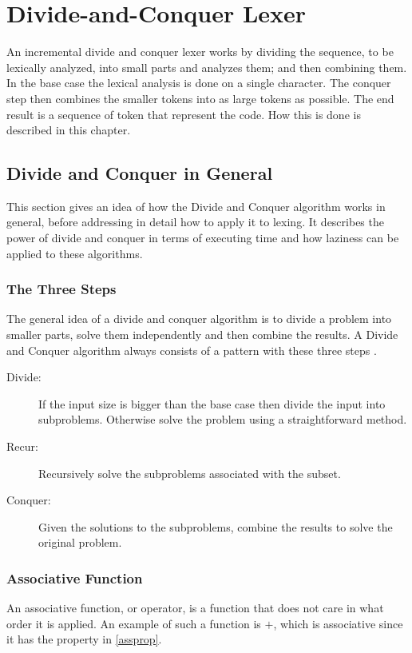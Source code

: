 \chapter{Divide-and-Conquer Lexer}
An incremental divide and conquer lexer works by dividing the sequence, to be
lexically analyzed, into small parts and analyzes them; and then combining them.
In the base case the lexical analysis is done on a single character. The
conquer step then combines the smaller tokens into as large tokens as possible.
The end result is a sequence of token that represent the code. How this is done
is described in this chapter.

\section{Divide and Conquer in General}
This section gives an idea of how the Divide and Conquer algorithm
works in general, before addressing in detail how to apply it to lexing. It
describes the power of divide and conquer in terms of executing time and how
laziness can be applied to these algorithms.

\subsection{The Three Steps}
The general idea of a divide and conquer algorithm is to divide a problem into
smaller parts, solve them independently and then combine the results. A Divide
and Conquer algorithm always consists of a pattern with these three steps
\cite{Goodrich}.
\begin{description}
\item[Divide:] If the input size is bigger than the base case then divide the
input into subproblems. Otherwise solve the problem using a straightforward
method.
\item[Recur:] Recursively solve the subproblems associated with the subset.
\item[Conquer:] Given the solutions to the subproblems, combine the results to
solve the original problem.
\end{description}

\subsection{Associative Function}
An associative function, or operator, is a function that does not care in what
order it is applied. An example of such a function is $+$, which is associative
since it has the property in \cref{assprop}.

